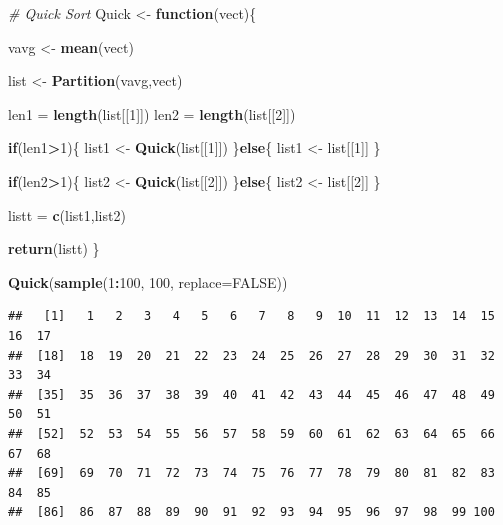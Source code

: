 \documentclass[]{article}
\newenvironment{Shaded}{\begin{snugshade}}{\end{snugshade}}
\newcommand{\KeywordTok}[1]{\textcolor[rgb]{0.13,0.29,0.53}{\textbf{#1}}}
\newcommand{\DataTypeTok}[1]{\textcolor[rgb]{0.13,0.29,0.53}{#1}}
\newcommand{\DecValTok}[1]{\textcolor[rgb]{0.00,0.00,0.81}{#1}}
\newcommand{\StringTok}[1]{\textcolor[rgb]{0.31,0.60,0.02}{#1}}
\newcommand{\CommentTok}[1]{\textcolor[rgb]{0.56,0.35,0.01}{\textit{#1}}}
\newcommand{\OtherTok}[1]{\textcolor[rgb]{0.56,0.35,0.01}{#1}}
\newcommand{\ControlFlowTok}[1]{\textcolor[rgb]{0.13,0.29,0.53}{\textbf{#1}}}
\newcommand{\OperatorTok}[1]{\textcolor[rgb]{0.81,0.36,0.00}{\textbf{#1}}}
\newcommand{\NormalTok}[1]{#1}
\begin{document}
\begin{Shaded}
\begin{Highlighting}[]
\CommentTok{# Quick Sort}
\NormalTok{Quick <-}\StringTok{ }\ControlFlowTok{function}\NormalTok{(vect)\{}
  
  
\NormalTok{  vavg <-}\StringTok{ }\KeywordTok{mean}\NormalTok{(vect)}
  
\NormalTok{  list <-}\StringTok{ }\KeywordTok{Partition}\NormalTok{(vavg,vect)}
  
\NormalTok{  len1 =}\StringTok{ }\KeywordTok{length}\NormalTok{(list[[}\DecValTok{1}\NormalTok{]])}
\NormalTok{  len2 =}\StringTok{ }\KeywordTok{length}\NormalTok{(list[[}\DecValTok{2}\NormalTok{]])}

  \ControlFlowTok{if}\NormalTok{(len1}\OperatorTok{>}\DecValTok{1}\NormalTok{)\{}
\NormalTok{    list1 <-}\StringTok{ }\KeywordTok{Quick}\NormalTok{(list[[}\DecValTok{1}\NormalTok{]])}
\NormalTok{  \}}\ControlFlowTok{else}\NormalTok{\{}
\NormalTok{    list1 <-}\StringTok{ }\NormalTok{list[[}\DecValTok{1}\NormalTok{]]}
\NormalTok{  \}}
  
  \ControlFlowTok{if}\NormalTok{(len2}\OperatorTok{>}\DecValTok{1}\NormalTok{)\{}
\NormalTok{    list2 <-}\StringTok{ }\KeywordTok{Quick}\NormalTok{(list[[}\DecValTok{2}\NormalTok{]])}
\NormalTok{  \}}\ControlFlowTok{else}\NormalTok{\{}
\NormalTok{    list2 <-}\StringTok{ }\NormalTok{list[[}\DecValTok{2}\NormalTok{]]}
\NormalTok{  \}}
  
  
\NormalTok{  listt =}\StringTok{ }\KeywordTok{c}\NormalTok{(list1,list2)}
  
  \KeywordTok{return}\NormalTok{(listt)}
\NormalTok{\}}

\KeywordTok{Quick}\NormalTok{(}\KeywordTok{sample}\NormalTok{(}\DecValTok{1}\OperatorTok{:}\DecValTok{100}\NormalTok{, }\DecValTok{100}\NormalTok{, }\DataTypeTok{replace=}\OtherTok{FALSE}\NormalTok{))}
\end{Highlighting}
\end{Shaded}

\begin{verbatim}
##   [1]   1   2   3   4   5   6   7   8   9  10  11  12  13  14  15  16  17
##  [18]  18  19  20  21  22  23  24  25  26  27  28  29  30  31  32  33  34
##  [35]  35  36  37  38  39  40  41  42  43  44  45  46  47  48  49  50  51
##  [52]  52  53  54  55  56  57  58  59  60  61  62  63  64  65  66  67  68
##  [69]  69  70  71  72  73  74  75  76  77  78  79  80  81  82  83  84  85
##  [86]  86  87  88  89  90  91  92  93  94  95  96  97  98  99 100
\end{verbatim}
\end{document}
